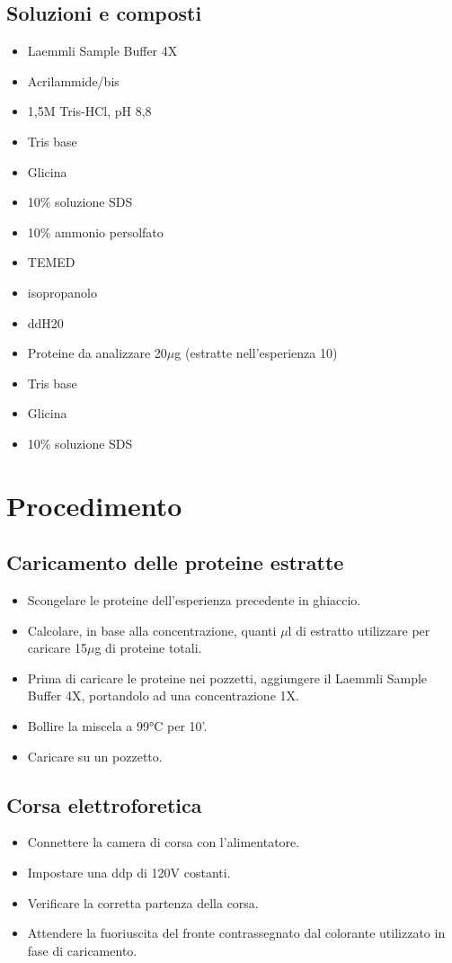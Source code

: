 \subsection{Soluzioni e composti}

\begin{itemize}
\item Laemmli Sample Buffer 4X
\item Acrilammide/bis
\item 1,5M Tris-HCl, pH 8,8
\item Tris base
\item Glicina
\item 10\% soluzione SDS
\item 10\% ammonio persolfato
\item TEMED
\item isopropanolo
\item ddH20
\item Proteine da analizzare 20$\mu$g (estratte nell'esperienza 10)
\item Tris base
\item Glicina
\item 10\% soluzione SDS
\end{itemize}


\section{Procedimento}

\subsection{Caricamento delle proteine estratte}
\begin{itemize}
	\item Scongelare le proteine dell'esperienza precedente in ghiaccio.
	\item Calcolare, in base alla concentrazione, quanti $\mu$l di estratto
	utilizzare per caricare 15$\mu$g di proteine totali.
	\item Prima di caricare le proteine nei pozzetti, aggiungere il Laemmli Sample
	Buffer 4X, portandolo ad una concentrazione 1X.
	\item Bollire la miscela a 99°C per 10'.
	\item Caricare su un pozzetto.
\end{itemize}

\subsection{Corsa elettroforetica}
\begin{itemize}
	\item Connettere la camera di corsa con l'alimentatore.
	\item Impostare una ddp di 120V costanti.
	\item Verificare la corretta partenza della corsa.
	\item Attendere la fuoriuscita del fronte contrassegnato dal colorante utilizzato
	in fase di caricamento.
\end{itemize}

